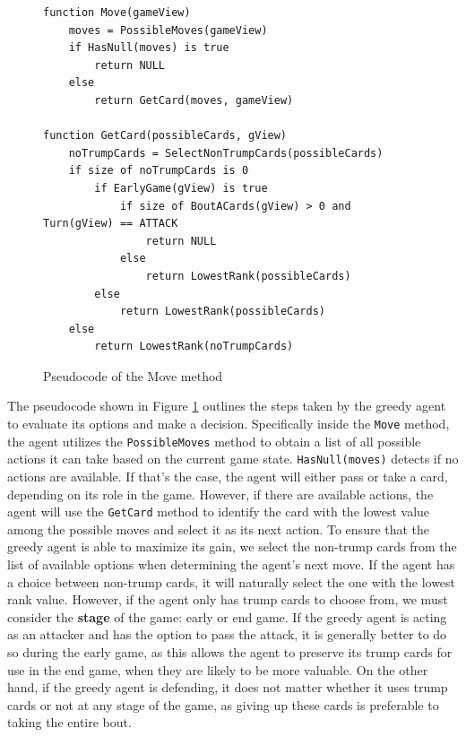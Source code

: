 \begin{figure}[h]
\captionsetup{justification=centering}
\begin{lstlisting}
function Move(gameView)
    moves = PossibleMoves(gameView)
    if HasNull(moves) is true
        return NULL
    else
        return GetCard(moves, gameView)

function GetCard(possibleCards, gView)
    noTrumpCards = SelectNonTrumpCards(possibleCards)
    if size of noTrumpCards is 0
        if EarlyGame(gView) is true
            if size of BoutACards(gView) > 0 and Turn(gView) == ATTACK
                return NULL
            else
                return LowestRank(possibleCards)
        else
            return LowestRank(possibleCards)
    else
        return LowestRank(noTrumpCards)
\end{lstlisting}
\caption{Pseudocode of the Move method}
\label{fig:greedyMove}
\end{figure}

The pseudocode shown in Figure \ref{fig:greedyMove} outlines the steps taken by the greedy agent to evaluate its options and make a decision. Specifically inside the \texttt{Move} method, the agent utilizes the \texttt{PossibleMoves} method to obtain a list of all possible actions it can take based on the current game state. \texttt{HasNull(moves)} detects if no actions are available. If that's the case, the agent will either pass or take a card, depending on its role in the game. However, if there are available actions, the agent will use the \texttt{GetCard} method to identify the card with the lowest value among the possible moves and select it as its next action. To ensure that the greedy agent is able to maximize its gain, we select the non-trump cards from the list of available options when determining the agent's next move. If the agent has a choice between non-trump cards, it will naturally select the one with the lowest rank value. However, if the agent only has trump cards to choose from, we must consider the \textbf{stage} of the game: early or end game. If the greedy agent is acting as an attacker and has the option to pass the attack, it is generally better to do so during the early game, as this allows the agent to preserve its trump cards for use in the end game, when they are likely to be more valuable. On the other hand, if the greedy agent is defending, it does not matter whether it uses trump cards or not at any stage of the game, as giving up these cards is preferable to taking the entire bout.

